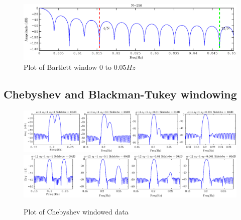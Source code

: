 \documentclass[10pt,twoside,a4paper]{report}
\begin{document}
\begin{figure}[h!]
\centering
\includegraphics[width=\textwidth]{cw1im/3e2.eps}
\caption{Plot of Bartlett window $0$ to $0.05Hz$}
\label{fig:3e}
\end{figure}


\subsection{Chebyshev and Blackman-Tukey windowing}
\begin{figure}[h!]
\centering
\includegraphics[width=\textwidth]{cw1im/3f_chebwin.eps}
\includegraphics[width=\textwidth]{cw1im/3f_chebwin12.eps}
\caption{Plot of Chebyshev windowed data}
\label{fig:3fcheb}
\end{figure}
\end{document}

